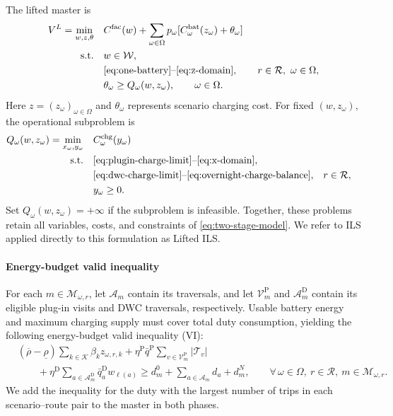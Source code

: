 The lifted master is
\begin{equation}
\begin{aligned}
 V^L=\min_{w,z,\theta}\quad
 &C^{\mathrm{fac}}(w)+\sum_{\omega\in\Omega}p_\omega
 [C_\omega^{\mathrm{bat}}(z_\omega)+\theta_\omega]\\
 \mathrm{s.t.}\quad &w\in\mathcal W,\\
 &\eqref{eq:one-battery}\text{--}\eqref{eq:z-domain},
 \qquad r\in\mathcal R,\ \omega\in\Omega,\\
 &\theta_\omega\ge Q_\omega(w,z_\omega),\qquad\omega\in\Omega.
\end{aligned}
\label{eq:exact-lifted-formulation}
\end{equation}
Here $z=(z_\omega)_{\omega\in\Omega}$ and $\theta_\omega$ represents scenario charging cost.
For fixed $(w,z_\omega)$, the operational subproblem is
\begin{equation}
\begin{aligned}
 Q_\omega(w,z_\omega)=\min_{x_\omega,y_\omega}\quad
 &C_\omega^{\mathrm{chg}}(y_\omega)\\
 \mathrm{s.t.}\quad
 &\eqref{eq:plugin-charge-limit}\text{--}\eqref{eq:x-domain},\\
 &\eqref{eq:dwc-charge-limit}\text{--}\eqref{eq:overnight-charge-balance},
 &&r\in\mathcal R,\\
 &y_\omega\ge0.
\end{aligned}
\label{eq:operational-recourse}
\end{equation}
Set $Q_\omega(w,z_\omega)=+\infty$ if the subproblem is infeasible.
Together, these problems retain all variables, costs, and constraints of \eqref{eq:two-stage-model}.
We refer to ILS applied directly to this formulation as Lifted ILS.

\paragraph{Energy-budget valid inequality}
For each $m\in\mathcal M_{\omega,r}$, let $\mathcal A_m$ contain its traversals, and let $\mathcal V_m^{\mathrm P}$ and $\mathcal A_m^{\mathrm D}$ contain its eligible plug-in visits and DWC traversals, respectively.
Usable battery energy and maximum charging supply must cover total duty consumption, yielding the following energy-budget valid inequality (VI):
\begin{equation}
\begin{aligned}
 &(\overline\rho-\underline\rho)\sum_{k\in\mathcal K}\beta_k z_{\omega,r,k}
 +\eta^{\mathrm P}\bar q^{\mathrm P}\sum_{v\in\mathcal V_m^{\mathrm P}}|\mathcal T_v|\\
 &\qquad+\eta^{\mathrm D}\sum_{a\in\mathcal A_m^{\mathrm D}}\bar q_a^{\mathrm D}w_{\ell(a)}
 \ge d_m^0+\sum_{a\in\mathcal A_m}d_a+d_m^N,
 \qquad \forall\,\omega\in\Omega,\ r\in\mathcal R,\ m\in\mathcal M_{\omega,r}.
\end{aligned}
\label{eq:energy-budget-vi}
\end{equation}
We add the inequality for the duty with the largest number of trips in each scenario--route pair to the master in both phases.

